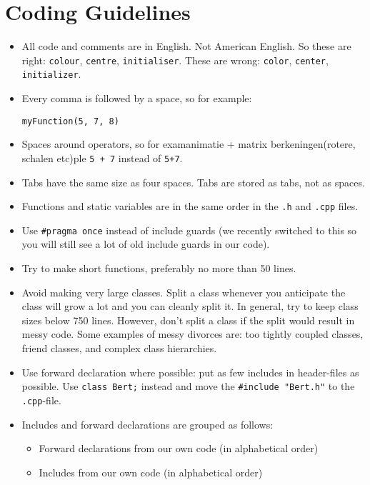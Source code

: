 \documentclass{article}
\begin{document}
\section*{Coding Guidelines}

\begin{itemize}
    \item All code and comments are in English. Not American English. So these are right: \texttt{colour}, \texttt{centre}, \texttt{initialiser}. These are wrong: \texttt{color}, \texttt{center}, \texttt{initializer}.
    \item Every comma is followed by a space, so for example:
          \begin{Verbatim}[fontsize=\small]
              myFunction(5, 7, 8)
          \end{Verbatim}
    \item Spaces around operators, so for examanimatie + matrix berkeningen(rotere, schalen etc)ple \texttt{5 + 7} instead of \texttt{5+7}.
    \item Tabs have the same size as four spaces. Tabs are stored as tabs, not as spaces.
    \item Functions and static variables are in the same order in the \texttt{.h} and \texttt{.cpp} files.
    \item Use \texttt{\#pragma once} instead of include guards (we recently switched to this so you will still see a lot of old include guards in our code).
    \item Try to make short functions, preferably no more than 50 lines.
    \item Avoid making very large classes. Split a class whenever you anticipate the class will grow a lot and you can cleanly split it. In general, try to keep class sizes below 750 lines. However, don't split a class if the split would result in messy code. Some examples of messy divorces are: too tightly coupled classes, friend classes, and complex class hierarchies.
    \item Use forward declaration where possible: put as few includes in header-files as possible. Use \texttt{class Bert;} instead and move the \texttt{\#include "Bert.h"} to the \texttt{.cpp}-file.
    \item Includes and forward declarations are grouped as follows:
          \begin{itemize}
              \item Forward declarations from our own code (in alphabetical order)
              \item Includes from our own code (in alphabetical order)

\end{itemize}
\end{itemize}
\end{document}
